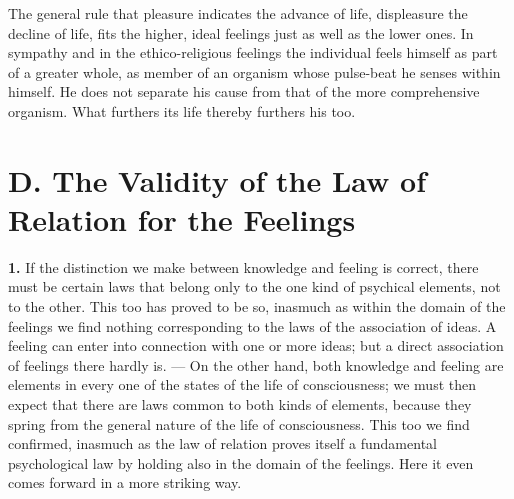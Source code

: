 \documentclass[12pt,a4paper]{book}
\newcommand{\opage}[1]{\marginnote{\footnotesize\textit{[#1]}}}
\begin{document}
The general rule that pleasure indicates the advance of life,
displeasure the decline of life, fits the higher, ideal feelings just as
well as the lower ones. In sympathy and in the ethico-religious feelings
the individual feels himself as part of a greater whole, as member of an
organism whose pulse-beat he senses within himself. He does not separate
his cause from that of the more
\opage{326}comprehensive organism. What furthers its life thereby
furthers his too.

\section*{D. The Validity of the Law of Relation for the Feelings}

\textbf{1.} If the distinction we make between knowledge and feeling is
correct, there must be certain laws that belong only to the one kind of
psychical elements, not to the other. This too has proved to be so,
inasmuch as within the domain of the feelings we find nothing
corresponding to the laws of the association of ideas. A feeling can
enter into connection with one or more ideas; but a direct association
of feelings there hardly is. --- On the other hand, both knowledge and
feeling are elements in every one of the states of the life of
consciousness; we must then expect that there are laws common to both
kinds of elements, because they spring from the general nature of the
life of consciousness. This too we find confirmed, inasmuch as the law
of relation proves itself a fundamental psychological law by holding
also in the domain of the feelings. Here it even comes forward in a more
striking way.
\end{document}
